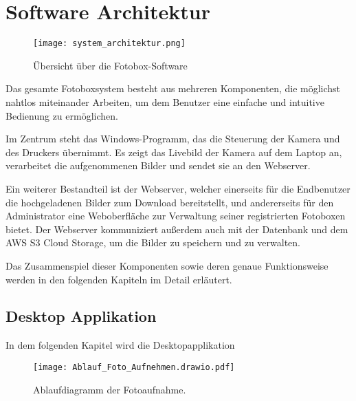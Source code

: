 \graphicspath{{images/program}}

\section{Software Architektur}

\begin{figure}[H]
    \centering
    \texttt{[image: system\_architektur.png]}
    \caption{Übersicht über die Fotobox-Software}
    \label{fig:system_architektur}
\end{figure}


Das gesamte Fotoboxsystem besteht aus mehreren Komponenten, die möglichst nahtlos
miteinander Arbeiten, um dem Benutzer eine einfache und intuitive Bedienung
zu ermöglichen. 

Im Zentrum steht das Windows-Programm, das die Steuerung der Kamera und des
Druckers übernimmt. Es zeigt das Livebild der Kamera auf dem Laptop an,
verarbeitet die aufgenommenen Bilder und sendet sie an den Webserver.

Ein weiterer Bestandteil ist der Webserver, welcher einerseits für die 
Endbenutzer die hochgeladenen Bilder zum Download bereitstellt, und andererseits
für den Administrator eine Weboberfläche zur Verwaltung seiner registrierten 
Fotoboxen bietet. Der Webserver kommuniziert außerdem auch mit der
Datenbank und dem AWS S3 Cloud Storage, um die Bilder zu speichern und
zu verwalten.

Das Zusammenspiel dieser Komponenten sowie deren genaue Funktionsweise werden
in den folgenden Kapiteln im Detail erläutert.

\newpage

\subsection{Desktop Applikation}

In dem folgenden Kapitel wird die Desktopapplikation 

\begin{figure}[H]
    \centering
    \texttt{[image: Ablauf\_Foto\_Aufnehmen.drawio.pdf]}
    \caption{Ablaufdiagramm der Fotoaufnahme.}
    \label{fig:Ablauf_Foto_Aufnehmen}
\end{figure}

